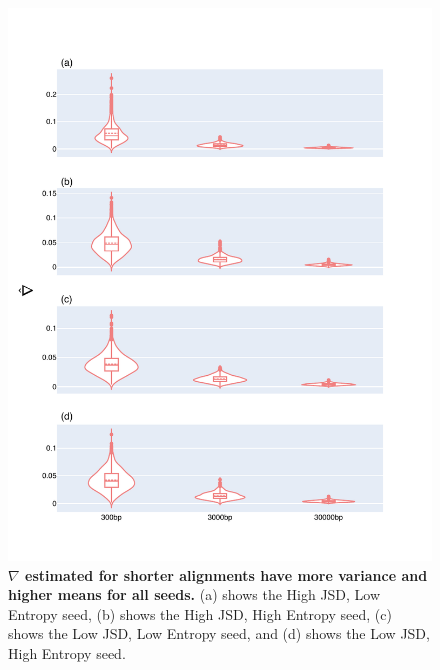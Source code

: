 \begin{figure}[!ht]
\centering
\includegraphics[width=\textwidth]{figures/plots/synthetic/convergence/all_seeds.pdf}
\caption[$\nabla$ estimated for shorter alignments have more variance and higher means for all seeds]{\textbf{$\nabla$ estimated for shorter alignments have more variance and higher means for all seeds.} (a) shows the High JSD, Low Entropy seed, (b) shows the High JSD, High Entropy seed, (c) shows the Low JSD, Low Entropy seed, and (d) shows the Low JSD, High Entropy seed.}
\label{fig:synthetic/conv/all_seeds}
\end{figure}